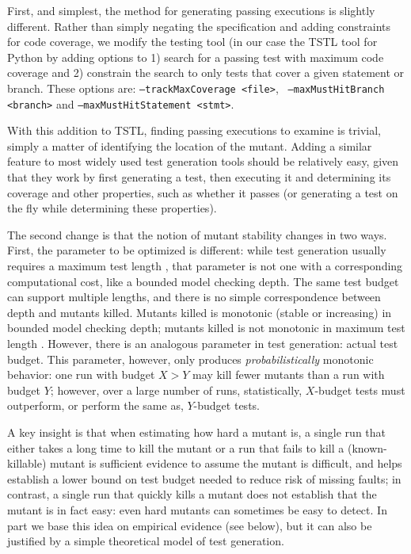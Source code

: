 \documentclass{svjour3}
\begin{document}
First, and simplest, the method for generating passing executions is
slightly different.  Rather than simply negating the specification and
adding constraints for code coverage, we modify the testing tool (in
our case the TSTL tool for Python \cite{tstlsttt,NFM15} by adding
options to 1) search for a passing test with maximum code coverage and
2) constrain the search to only tests that cover a given statement or
branch.  These options are:  {\tt --trackMaxCoverage <file>}, {\tt
  --maxMustHitBranch <branch>} and {\tt --maxMustHitStatement <stmt>}.

With this addition to TSTL, finding passing executions to examine is
trivial, simply a matter of identifying the location of the mutant.
Adding a similar feature to most widely used test generation tools
should be relatively easy, given that they work by first generating a test, then
executing it and determining its coverage and other properties, such as
whether it passes (or generating a test on the fly while determining
these properties).  

The second change is that the notion of mutant stability changes in
two ways.  First, the parameter to be optimized is different:  while
test generation usually requires a maximum test length \cite{ASE08},
that parameter is not one with a corresponding computational cost,
like a bounded model checking depth.  The same test budget can support
multiple lengths, and there is no simple correspondence between depth
and mutants killed.  Mutants killed is monotonic (stable or
increasing) in bounded model checking depth; mutants killed is not
monotonic in maximum test length \cite{ASE08}.  However, there is an
analogous parameter in test generation:  actual test budget.  This
parameter, however, only produces \emph{probabilistically} \cite{arcuri2014hitchhiker} monotonic
behavior:  one run with budget $X > Y$ may kill fewer mutants than a
run with budget $Y$; however, over a large number of runs,
statistically, $X$-budget tests must outperform, or perform the same
as, $Y$-budget tests.

A key insight is that when estimating how hard a mutant is, a single
run that either takes a long time to kill the mutant or a run that
fails to kill a (known-killable) mutant is sufficient evidence to
assume the mutant is difficult, and helps establish a lower bound on
test budget needed to reduce risk of missing faults; in contrast, a
single run that quickly kills a mutant does not establish that the
mutant is in fact easy:  even hard mutants can sometimes be easy to
detect.  In part we base this idea on empirical evidence (see below),
but it can also be justified by a simple theoretical model of test
generation.  
\end{document}
